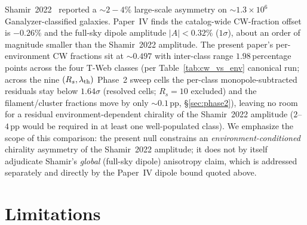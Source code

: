\documentclass[aps,prd,twocolumn,superscriptaddress,showpacs,preprintnumbers,nofootinbib,longbibliography,floatfix]{revtex4-2}
\begin{document}
Shamir~2022~\cite{Shamir2022DESI} reported a $\sim 2\!-\!4\%$
large-scale asymmetry on $\sim\!1.3\!\times\!10^6$ Ganalyzer-classified
galaxies. Paper~IV finds the catalog-wide CW-fraction offset is
$-0.26\%$ and the full-sky dipole amplitude $|A|\!<\!0.32\%$
($1\sigma$), about an order of magnitude smaller than the Shamir~2022
amplitude. The present paper's per-environment CW fractions sit at
$\sim 0.497$ with inter-class range $1.98$\,percentage points across the four
T-Web classes (per Table~\ref{tab:cw_vs_env} canonical run; across
the nine $(R_s, \lambda_{\rm th})$ Phase~2
sweep cells the per-class monopole-subtracted residuals stay below
$1.64\sigma$ (resolved cells; $R_s\!=\!10$ excluded) and the filament/cluster fractions move by
only ${\sim}0.1$\,pp, \S\ref{sec:phase2}), leaving no room
for a residual environment-dependent chirality of the Shamir~2022
amplitude ($2$--$4$\,pp would be required in at least one well-populated
class). We emphasize the scope of this comparison: the present null
constrains an \emph{environment-conditioned} chirality asymmetry of
the Shamir~2022 amplitude; it does not by itself adjudicate
Shamir's \emph{global} (full-sky dipole) anisotropy claim, which is
addressed separately and directly by the Paper~IV dipole bound quoted
above.

\section{Limitations}\label{sec:limitations}
\end{document}
